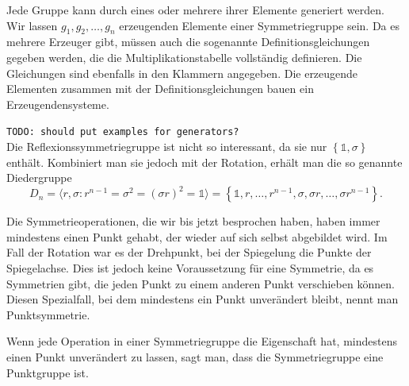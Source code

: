 \begin{definition}[Erzeugendensysteme]
	Jede Gruppe kann durch eines oder mehrere ihrer Elemente generiert werden.
	Wir lassen \(g_1, g_2, \ldots, g_n\) erzeugenden Elemente einer
	Symmetriegruppe sein.  Da es mehrere Erzeuger gibt, müssen auch die
	sogenannte Definitionsgleichungen gegeben werden, die die
	Multiplikationstabelle vollständig definieren. Die Gleichungen sind ebenfalls
	in den Klammern angegeben. Die erzeugende Elementen zusammen mit der
	Definitionsgleichungen bauen ein Erzeugendensysteme.
\end{definition}

\texttt{TODO: should put examples for generators?} \\

Die Reflexionssymmetriegruppe ist nicht so interessant, da sie nur
\(\left\{\mathds{1}, \sigma\right\}\) enthält. Kombiniert man sie jedoch mit
der Rotation, erhält man die so genannte Diedergruppe
\[
	D_n = \langle r, \sigma : r^{n-1} = \sigma^2 = (\sigma r)^2 = \mathds{1} \rangle
		= \left\{
				\mathds{1}, r, \ldots, r^{n-1}, \sigma, \sigma r, \ldots, \sigma r^{n-1}
		\right\}.
\]

Die Symmetrieoperationen, die wir bis jetzt besprochen haben, haben immer
mindestens einen Punkt gehabt, der wieder auf sich selbst abgebildet wird. Im
Fall der Rotation war es der Drehpunkt, bei der Spiegelung die Punkte der
Spiegelachse. Dies ist jedoch keine Voraussetzung für eine Symmetrie, da es
Symmetrien gibt, die jeden Punkt zu einem anderen Punkt verschieben können.
Diesen Spezialfall, bei dem mindestens ein Punkt unverändert bleibt, nennt man
Punktsymmetrie.
\begin{definition}[Punktgruppe]
	Wenn jede Operation in einer Symmetriegruppe die Eigenschaft hat, mindestens
	einen Punkt unverändert zu lassen, sagt man, dass die Symmetriegruppe eine
	Punktgruppe ist.
\end{definition}

